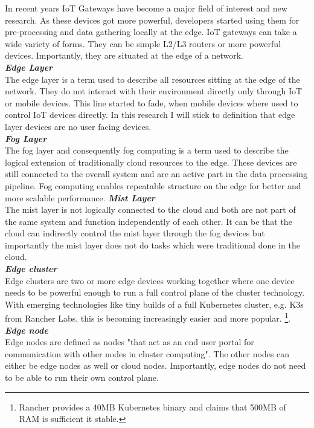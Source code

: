 In recent years IoT Gateways have become a major field of interest and new research. As these devices got more powerful, developers started using them for pre-processing and data gathering locally at the edge.
IoT gateways can take a wide variety of forms. They can be simple L2/L3 routers or more powerful devices. Importantly, they are situated at the edge of a network.\\[5mm]
\textbf{\textit{Edge Layer}}\\
The edge layer is a term used to describe all resources sitting at the edge of the network. They do not interact with their environment directly only through IoT or mobile devices. This line started to fade, when mobile devices where used to control IoT devices directly. In this research I will stick to definition that edge layer devices are no user facing devices.\\[5mm]
\textbf{\textit{Fog Layer}}\\
The fog layer and consequently fog computing is a term used to describe the logical extension of traditionally cloud resources to the edge. These devices are still connected to the overall system and are an active part in the data processing pipeline. Fog computing enables repeatable structure on the edge for better and more scalable performance.
\textbf{\textit{Mist Layer}}\\
The mist layer is not logically connected to the cloud and both are not part of the same system and function independently of each other. It can be that the cloud can indirectly control the mist layer through the fog devices but importantly the mist layer does not do tasks which were traditional done in the cloud. \\[5mm]
\textbf{\textit{Edge cluster}}\\
Edge clusters are two or more edge devices working together where one device needs to be powerful enough to run a full control plane of the cluster technology. With emerging technologies like tiny builds of a full Kubernetes cluster, e.g. K3s from Rancher Labs\cite{k3sLight14:online}, this is becoming increasingly easier and more popular.
\footnote{Rancher provides a 40MB Kubernetes binary and claims that 500MB of RAM is sufficient 
it stable.}.\\
\textbf{\textit{Edge node}}\\
Edge nodes are defined as nodes "that act as an end user portal for communication with other
nodes in cluster computing"\cite{Whatised17:edgeNodeDef}. The other nodes can either be edge nodes as well or cloud nodes. Importantly, edge nodes do not need to be able to run their own control plane.